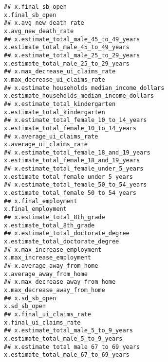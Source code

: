 \documentclass[
]{article}
\begin{document}
\begin{verbatim}
## x.final_sb_open                                                                                         x.final_sb_open
## x.avg_new_death_rate                                                                               x.avg_new_death_rate
## x.estimate_total_male_45_to_49_years                                               x.estimate_total_male_45_to_49_years
## x.estimate_total_male_25_to_29_years                                               x.estimate_total_male_25_to_29_years
## x.max_decrease_ui_claims_rate                                                             x.max_decrease_ui_claims_rate
## x.estimate_households_median_income_dollars                                 x.estimate_households_median_income_dollars
## x.estimate_total_kindergarten                                                             x.estimate_total_kindergarten
## x.estimate_total_female_10_to_14_years                                           x.estimate_total_female_10_to_14_years
## x.average_ui_claims_rate                                                                       x.average_ui_claims_rate
## x.estimate_total_female_18_and_19_years                                         x.estimate_total_female_18_and_19_years
## x.estimate_total_female_under_5_years                                             x.estimate_total_female_under_5_years
## x.estimate_total_female_50_to_54_years                                           x.estimate_total_female_50_to_54_years
## x.final_employment                                                                                   x.final_employment
## x.estimate_total_8th_grade                                                                   x.estimate_total_8th_grade
## x.estimate_total_doctorate_degree                                                     x.estimate_total_doctorate_degree
## x.max_increase_employment                                                                     x.max_increase_employment
## x.average_away_from_home                                                                       x.average_away_from_home
## x.max_decrease_away_from_home                                                             x.max_decrease_away_from_home
## x.sd_sb_open                                                                                               x.sd_sb_open
## x.final_ui_claims_rate                                                                           x.final_ui_claims_rate
## x.estimate_total_male_5_to_9_years                                                   x.estimate_total_male_5_to_9_years
## x.estimate_total_male_67_to_69_years                                               x.estimate_total_male_67_to_69_years

\end{verbatim}
\end{document}

